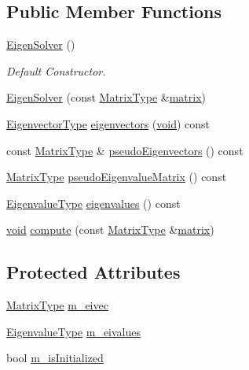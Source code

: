 \subsection*{Public Member Functions}
\begin{DoxyCompactItemize}
\item 
\hyperlink{class_eigen_solver_a1b1c5e0e87583d3f0c7d00a17b8cd900}{Eigen\-Solver} ()
\begin{DoxyCompactList}\small\item\em Default Constructor. \end{DoxyCompactList}\item 
\hyperlink{class_eigen_solver_abfb6083ab9d2a615baa3af146ddc3b53}{Eigen\-Solver} (const \hyperlink{class_eigen_solver_a2fd3a7b430468ffe4316cb8729c80bb2}{Matrix\-Type} \&\hyperlink{glext_8h_a7b24a3f2f56eb1244ae69dacb4fecb6f}{matrix})
\item 
\hyperlink{class_eigen_solver_a573e33fff25ab71e92f5f3d50eb80338}{Eigenvector\-Type} \hyperlink{class_eigen_solver_a12d253e435c886edd9098af7e53d1715}{eigenvectors} (\hyperlink{group___u_a_v_objects_plugin_ga444cf2ff3f0ecbe028adce838d373f5c}{void}) const 
\item 
const \hyperlink{class_eigen_solver_a2fd3a7b430468ffe4316cb8729c80bb2}{Matrix\-Type} \& \hyperlink{class_eigen_solver_ac8e31dcdee7148865704adc2d145c25f}{pseudo\-Eigenvectors} () const 
\item 
\hyperlink{class_eigen_solver_a2fd3a7b430468ffe4316cb8729c80bb2}{Matrix\-Type} \hyperlink{class_eigen_solver_a5db680e1e08078ed30e477322409f12e}{pseudo\-Eigenvalue\-Matrix} () const 
\item 
\hyperlink{class_eigen_solver_abeff77daec5eb8f177c90adc13a4fba0}{Eigenvalue\-Type} \hyperlink{class_eigen_solver_a757c9c9839509c514d3d541288073614}{eigenvalues} () const 
\item 
\hyperlink{group___u_a_v_objects_plugin_ga444cf2ff3f0ecbe028adce838d373f5c}{void} \hyperlink{class_eigen_solver_aaa0bd956b37d7929078ee54ba9662523}{compute} (const \hyperlink{class_eigen_solver_a2fd3a7b430468ffe4316cb8729c80bb2}{Matrix\-Type} \&\hyperlink{glext_8h_a7b24a3f2f56eb1244ae69dacb4fecb6f}{matrix})
\end{DoxyCompactItemize}
\subsection*{Protected Attributes}
\begin{DoxyCompactItemize}
\item 
\hyperlink{class_eigen_solver_a2fd3a7b430468ffe4316cb8729c80bb2}{Matrix\-Type} \hyperlink{class_eigen_solver_a3e70e63cdecd25adfdfa895c867269b7}{m\-\_\-eivec}
\item 
\hyperlink{class_eigen_solver_abeff77daec5eb8f177c90adc13a4fba0}{Eigenvalue\-Type} \hyperlink{class_eigen_solver_afe25fa1caa5b650612c712a333ae14d6}{m\-\_\-eivalues}
\item 
bool \hyperlink{class_eigen_solver_ab982df42f44631be52969b190229c47a}{m\-\_\-is\-Initialized}
\end{DoxyCompactItemize}


